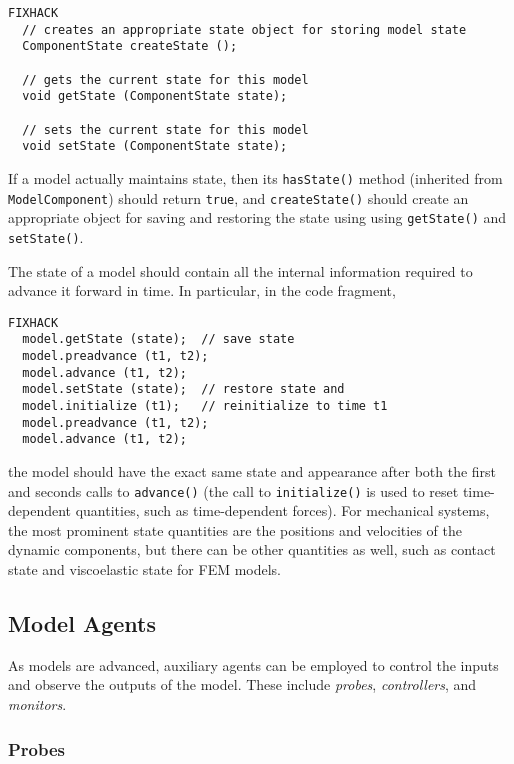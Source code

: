 \documentclass{article}
\begin{document}
\begin{lstlisting}FIXHACK
  // creates an appropriate state object for storing model state
  ComponentState createState ();

  // gets the current state for this model
  void getState (ComponentState state);

  // sets the current state for this model
  void setState (ComponentState state);
\end{lstlisting}

If a model actually maintains state, then its {\tt hasState()} method
(inherited from {\tt ModelComponent}) should return {\tt true}, and
{\tt createState()} should create an appropriate object for saving and
restoring the state using using {\tt getState()} and {\tt setState()}.

The state of a model should contain all the internal information
required to advance it forward in time. In particular, in the code
fragment,

\begin{lstlisting}FIXHACK
  model.getState (state);  // save state
  model.preadvance (t1, t2);
  model.advance (t1, t2);
  model.setState (state);  // restore state and
  model.initialize (t1);   // reinitialize to time t1
  model.preadvance (t1, t2);
  model.advance (t1, t2);
\end{lstlisting}

the model should have the exact same state and appearance after both
the first and seconds calls to {\tt advance()} (the call to {\tt initialize()} is
used to reset time-dependent quantities, such as time-dependent
forces). For mechanical systems, the most prominent state quantities
are the positions and velocities of the dynamic components, but there
can be other quantities as well, such as contact state and
viscoelastic state for FEM models.
  
\subsection{Model Agents}
\label{ModelAgentsSec}

As models are advanced, auxiliary agents can be employed to control
the inputs and observe the outputs of the model. These include
{\it probes}, {\it controllers}, and {\it monitors}.

\subsubsection{Probes}
\end{document}
